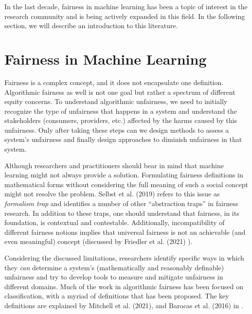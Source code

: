     In the last decade, fairness in machine learning has been a topic of interest in the research community and is being actively expanded in this field. In the following section, we will describe an introduction to this literature.

\section{Fairness in Machine Learning}
\label{sec:fair_ml}
    
    Fairness is a complex concept, and it does not encapsulate one definition. Algorithmic fairness as well is not one goal but rather a spectrum of different equity concerns. To understand algorithmic unfairness, we need to initially recognize the type of unfairness that happens in a system and understand the stakeholders (consumers, providers, etc.) affected by the harms caused by this unfairness. Only after taking these steps can we design methods to assess a system's unfairness and finally design approaches to diminish unfairness in that system.
    
    Although researchers and practitioners should bear in mind that machine learning might not always provide a solution. Formulating fairness definitions in mathematical forms without considering the full meaning of such a social concept might not resolve the problem. Selbst et al. (2019) \cite{selbst2019fairness} refers to this issue as \textit{formalism trap} and identifies a number of other ``abstraction traps'' in fairness research. In addition to these traps, one should understand that fairness, in its foundation, is contextual and contestable. Additionally, incompatibility of different fairness notions implies that universal fairness is not an achievable (and even meaningful) concept (discussed by Friedler et al. (2021) \cite{friedler-impossibility-2021}).
    
    Considering the discussed limitations, researchers identify specific ways in which they \textit{can} determine a system's (mathematically and reasonably definable) unfairness and try to develop tools to measure and mitigate unfairness in different domains. Much of the work in algorithmic fairness has been focused on classification, with a myriad of definitions that has been proposed. The key definitions are explained by Mitchell et al. (2021), and Barocas et al. (2016) in \cite{mitchell2021algorithmic,barocas2016big,barocas2018fairness}.
    

